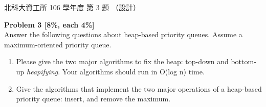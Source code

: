 \begin{pastexam}[label={px:ntut-106-prog-03}]{北科大資工所 106 學年度 第 3 題}
（設計）

\textbf{Problem 3 [8\%, each 4\%]}\\
Answer the following questions about heap-based priority queues. Assume a maximum-oriented
priority queue.
\begin{enumerate}[label=(\arabic*)]
\item Please give the two major algorithms to fix the heap: top-down and bottom-up
\textit{heapifying}. Your algorithms should run in O(log n) time.
\item Give the algorithms that implement the two major operations of a heap-based priority queue:
insert, and remove the maximum.
\end{enumerate}
\end{pastexam}

